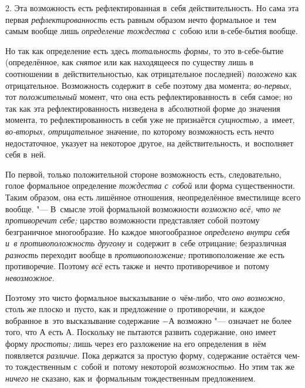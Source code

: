 2. Эта возможность есть рефлектированная в~себя действительность. Но сама
эта первая {\em рефлектированность} есть равным образом
нечто формальное и~тем самым вообще лишь
{\em определение тождества} с~собою или в-себе-бытия вообще.

Но так как определение есть здесь {\em тотальность
формы,} то это в-себе-бытие (определённое, как
{\em снятое} или как находящееся по существу лишь в
соотношении в~действительностью, как отрицательное последней)
{\em положено} как отрицательное. Возможность содержит
в~себе поэтому два момента; {\em во-первых,} тот
{\em положительный} момент, что она есть
рефлектированность в~себя самое; но так как эта рефлектированность
низведена в~абсолютной форме до значения момента, то рефлектированность в
себя уже не признаётся {\em сущностью,} а~имеет,
{\em во-вторых, отрицательное} значение, по которому возможность
есть нечто недостаточное, указует на некоторое другое, на действительность,
и~восполняет себя в~ней.

По первой, только положительной стороне возможность есть, следовательно,
голое формальное определение {\em тождества с~собой}
или форма существенности. Таким образом, она есть лишённое отношения,
неопределённое вместилище всего вообще. "--- В~смысле этой формальной
возможности {\em возможно всё, что не противоречит
себе;} царство возможности представляет собой поэтому безграничное
многообразие. Но каждое многообразное {\em определено
внутри себя и~в противоположность другому} и~содержит в~себе отрицание;
безразличная {\em разность} переходит вообще в
{\em противоположение;} противоположение же есть
противоречие. Поэтому {\em всё} есть также и~нечто
противоречивое и~потому {\em невозможное}.

Поэтому это чисто формальное высказывание о~чём-либо, что
{\em оно возможно,} столь же плоско и~пусто, как и
предложение о~противоречии, и~каждое вобранное в~это высказывание
содержание $-А$ возможно "--- означает не более того, что $А$
есть $А$. Поскольку не пытаются развить содержание, оно имеет форму
{\em простоты;} лишь через его разложение на его
определения в~нём появляется {\em различие}. Пока
держатся за простую форму, содержание остаётся чем-то тождественным с~собой
и~потому некоторой {\em возможностью}. Но этим так же
{\em ничего} не сказано, как и~формальным тождественным
предложением.

